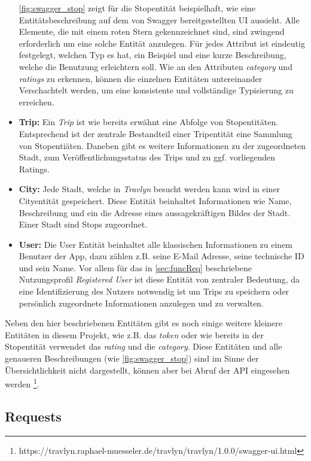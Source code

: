 \begin{itemize}
		\autoref{fig:swagger_stop} zeigt für die Stopentität beispielhaft, wie eine Entitätsbeschreibung auf dem von Swagger bereitgestellten UI aussieht. Alle Elemente, die mit einem roten Stern gekennzeichnet sind, sind zwingend erforderlich um eine solche Entität anzulegen. Für jedes Attribut ist eindeutig festgelegt, welchen Typ es hat, ein Beispiel und eine kurze Beschreibung, welche die Benutzung erleichtern soll. Wie an den Attributen \textit{category} und \textit{ratings} zu erkennen, können die einzelnen Entitäten untereinander Verschachtelt werden, um eine konsistente und vollständige Typisierung zu erreichen.   
		\item \textbf{Trip:} Ein \textit{Trip} ist wie bereits erwähnt eine Abfolge von Stopentitäten. Entsprechend ist der zentrale Bestandteil einer Tripentität eine Sammlung von Stopentiäten. Daneben gibt es weitere Informationen zu der zugeordneten Stadt, zum Veröffentlichungsstatus des Trips und zu ggf. vorliegenden Ratings.
		\item \textbf{City:} Jede Stadt, welche in \textit{Travlyn} besucht werden kann wird in einer Cityentität gespeichert. Diese Entität beinhaltet Informationen wie Name, Beschreibung und ein die Adresse eines aussagekräftigen Bildes der Stadt. Einer Stadt sind Stops zugeordnet. 
		\item \textbf{User:} Die User Entität beinhaltet alle klassischen Informationen zu einem Benutzer der App, dazu zählen z.B. seine E-Mail Adresse, seine technische ID und sein Name. Vor allem für das in  \autoref{sec:funcReq} beschriebene Nutzungsprofil \textit{Registered User} ist diese Entität von zentraler Bedeutung, da eine Identifizierung des Nutzers notwendig ist um Trips zu speichern oder persönlich zugeordnete Informationen anzulegen und zu verwalten.
	\end{itemize}

	Neben den hier beschriebenen Entitäten gibt es noch einige weitere kleinere Entitäten in diesem Projekt, wie z.B. das \textit{token} oder wie bereits in der Stopentität verwendet das \textit{rating} und die \textit{category}. Diese Entitäten und alle genaueren Beschreibungen (wie \autoref{fig:swagger_stop}) sind im Sinne der Übersichtlichkeit nicht dargestellt, können aber bei Abruf der API eingesehen werden \footnote{https://travlyn.raphael-muesseler.de/travlyn/travlyn/1.0.0/swagger-ui.html}.
	
	\subsection{Requests}
	
